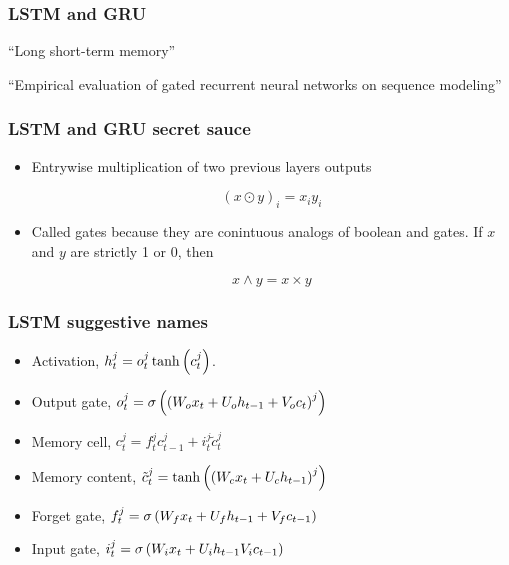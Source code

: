 \documentclass{beamer}
\begin{document}
\frame
{
   \frametitle{LSTM and GRU}

   ``Long short-term memory''\cite{hochreiter1997long}

   ``Empirical evaluation of gated recurrent neural networks on sequence modeling''\cite{chung2014empirical}
}

\frame
{
   \frametitle{LSTM and GRU secret sauce}

   \begin{itemize}
      \item<1-> Entrywise multiplication of two previous layers outputs

      $$(x \odot y)_i = x_i y_i$$

      \item<2-> Called gates because they are conintuous analogs of boolean and gates. If $x$ and $y$ are strictly 1 or 0, then
      
      $$x \wedge y = x \times y$$

   \end{itemize}
}


\frame
{
   \frametitle{LSTM suggestive names}

   \begin{itemize}
      \item<1-> Activation, $h^j_t = o^j_t \tanh \left({c^j_t}\right)$.
      
      \item<2-> Output gate, $o^j_t = \sigma \left({ \left({W_o x_t + U_o h_{t-1} + V_o c_t}\right)^j }\right)$

      \item<3-> Memory cell, $c^j_t = f^j_t c^j_{t-1} + i^j_t \tilde c^j_t$

      \item<4-> Memory content, $\tilde c^j_t = \tanh \left({ \left({W_c x_t + U_c h_{t-1}}\right)^j }\right)$

      \item<5-> Forget gate, $f^j_t = \sigma \left({W_f x_t + U_f h_{t-1} + V_f c_{t-1}}\right)$

      \item<6-> Input gate, $i^j_t = \sigma \left({W_i x_t + U_i h_{t-1} V_i c_{t-1}}\right)$

   \end{itemize}
}
\end{document}
